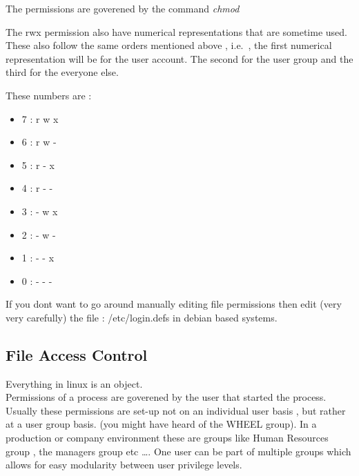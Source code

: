 
\noindent
The permissions are goverened by the command \textit{chmod}

\noindent
The rwx permission also have numerical representations that are sometime used.
These also follow the same orders mentioned above , i.e.\ , the first numerical
representation will be for the user account. The second for the user group and
the third for the everyone else.

\noindent
These numbers are :



\begin{itemize}[noitemsep]

	\item 7  :  r w x
	\item 6  :  r w -
	\item 5  :  r - x
	\item 4  :  r - -
	\item 3  :  - w x
	\item 2  :  - w -
	\item 1  :  - - x
	\item 0  :  - - -

\end{itemize}


\noindent
If you dont want to go around manually editing file permissions then edit (very
very carefully) the file : /etc/login.defs in debian based systems.


\subsectionend

\subsection{File Access Control}
\label{ssec:file_access_control}

Everything in linux is an object.\\

Permissions of a process are goverened by the user that started the process.\\

Usually these permissions are set-up not on an individual user basis , but
rather at a user group basis. (you might have heard of the WHEEL group). In a
production or company environment these are groups like Human Resources group ,
the managers group etc \ldots. One user can be part of multiple groups which
allows for easy modularity between user privilege levels.\\

